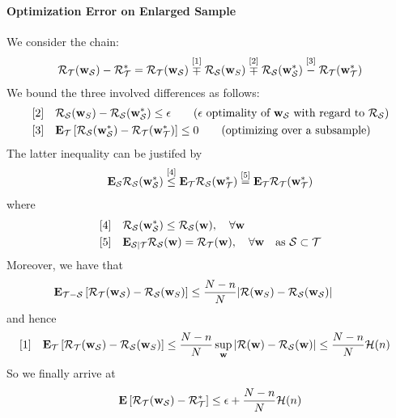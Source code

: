\documentclass{article}
\renewcommand{\S}{{\cal S}}
\newcommand{\T}{{\cal T}}
\newcommand{\w}{{\bf w}}
\newcommand{\risk}{{\cal R}}
\newcommand{\bound}{{\cal H}}
\newcommand{\E}{{\bf E}}
\begin{document}
\paragraph{Optimization Error on Enlarged Sample}
We consider the chain:
\begin{align}
\risk_\T(\w_\S) - \risk_\T^* = \risk_\T(\w_\S) \stackrel{[1]}{\mp} \risk_\S(\w_S) \stackrel{[2]}{\mp} \risk_\S(\w_\S^*) \stackrel{[3]}{-} \risk_\T(\w_\T^*)
\end{align}
We bound the three involved differences as follows: 
\begin{align}
\text{[2]} \quad & \risk_\S(\w_S)  - \risk_\S(\w_\S^*) \le \epsilon  \qquad 
\text{($\epsilon$ optimality of $\w_\S$ with regard to $\risk_\S$)}
\\
\text{[3]} \quad & \E_\T \left[ \risk_\S(\w_\S^*) - \risk_\T(\w_\T^*) \right] \le 0 \qquad 
\text{(optimizing over a subsample)}
\end{align}
The latter inequality can be justifed by
\begin{align}
\E_{\S} \risk_\S(\w_\S^*) \stackrel{[4]}{\le} \E_{\T} \risk_\S(\w_\T^*)  \stackrel{[5]}= \E_{\T} \risk_\T(\w_\T^*)  
\end{align}
where 
\begin{align}
\text{[4]} \quad & \risk_\S(\w_\S^*) \le \risk_\S(\w), \quad \forall \w\\
\text{[5]} \quad & \E_{\S | \T} \risk_\S(\w) = \risk_\T(\w), \quad \forall \w \quad \text{as $\S \subset \T$}
\end{align}
Moreover, we have that
\begin{align}
& \E_{\T-\S} \left[ \risk_\T(\w_\S) - \risk_\S(\w_S) \right] \le \frac{N- n}{N} | \risk(\w_S) - \risk_\S(\w_\S) |
\label{eq:t-s} \qquad 
\end{align}
and hence 
\begin{align}
\text{[1]} \quad & \E_{\T} \left[ \risk_\T(\w_\S) - \risk_\S(\w_S) \right] \le \frac{N-n}{N} \sup_\w | \risk(\w) - \risk_\S(\w) | \le \frac{N-n}{N} \bound(n)
\label{eq:t-s-all} 
\end{align}
%
So we finally arrive  at 
\begin{align}
\E \left[ \risk_\T(\w_\S) - \risk_\T^*\right] \le \epsilon + \frac{N-n}{N} \bound(n)
\label{eq:new-epsilon} 
\end{align}
\end{document}
